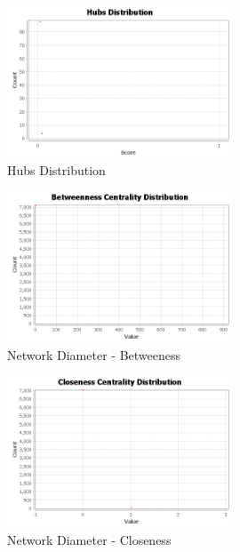 \documentclass[letterpaper,11pt]{report}
\begin{document}
\begin{savenotes}
\begin{figure}
	\centering
		\includegraphics[width=0.60\textwidth]{hubs.png}
	\caption{Hubs Distribution}
	\label{fig:hubs}
\end{figure}

\begin{figure}
	\centering
		\includegraphics[width=0.60\textwidth]{BetweennessCentralityDistribution.png}
	\caption{Network Diameter - Betweeness}
	\label{fig:Betweenness Centrality Distribution}
\end{figure}

\begin{figure}[htbp]
	\centering
		\includegraphics[width=0.60\textwidth]{ClosenessCentralityDistribution.png}
	\caption{Network Diameter - Closeness}
	\label{fig:Closeness Centrality Distribution}
\end{figure}


\end{savenotes}
\end{document}
